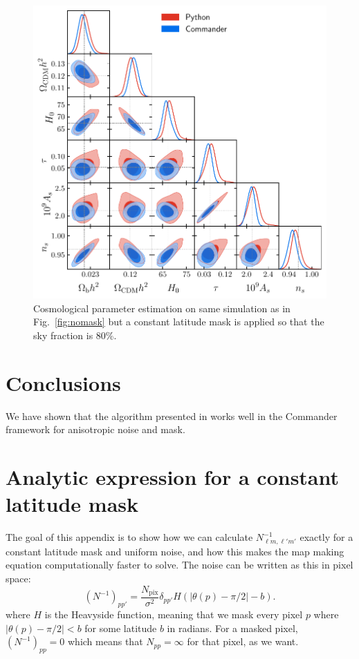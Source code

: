 \documentclass[twocolumn]{../common/aa}
\begin{document}
\begin{figure}
	\centering
	\includegraphics[width=\linewidth]{figures/dist_posterior_20_mask.pdf}
	\caption{Cosmological parameter estimation on same simulation as in Fig.~\ref{fig:nomask} but a constant latitude mask is applied so that the sky fraction is 80\%.}
\end{figure}

\section{Conclusions}
\label{sec:conclusions}

We have shown that the algorithm presented in \cite{racine:2016} works well in the Commander framework for anisotropic noise and mask.





\appendix

\section{Analytic expression for a constant latitude mask}
\label{sec:appendix}


The goal of this appendix is to show how we can calculate $N_{\ell m, \ell' m'}^{-1}$ exactly for a constant latitude mask and uniform noise, and how this makes the map making equation computationally faster to solve. The noise can be written as this in pixel space:
$$
\left(N^{-1} \right)_{pp'} = \frac{N_{\mathrm{pix}}}{\sigma^2} \delta_{pp'} H(|\theta(p) -\pi/2|-b).
$$
where $H$ is the Heavyside function, meaning that we mask every pixel $p$ where $|\theta(p) -\pi/2| < b$ for some latitude $b$ in radians. For a masked pixel, $\left(N^{-1} \right)_{pp}=0$ which means that $N_{pp} = \infty$ for that pixel, as we want.
\end{document}
